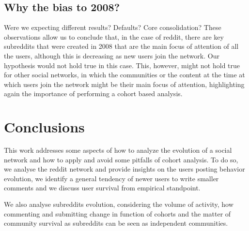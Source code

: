 \subsection{Why the bias to 2008?}

Were we expecting different results? Defaults? Core consolidation? 
These observations allow us to conclude that, in the case of reddit, there are key subreddits that were created in 2008 that are the main focus of attention of all the users, although this is decreasing as new users join the network. Our hypothesis would not hold true in this case. This, however, might not hold true for other social networks, in which the communities or the content at the time at which users join the network might be their main focus of attention, highlighting again the importance of performing a cohort based analysis.

\section{Conclusions}

This work addresses some aspects of how to analyze the evolution of a social network and how to apply and avoid some pitfalls of cohort analysis. To do so, we analyse the reddit network and provide insights on the users posting behavior evolution, we identify a general tendency of newer users to write smaller comments and we discuss user survival from empirical standpoint. 

We also analyse subreddits evolution, considering the volume of activity, how commenting and submitting change in function of cohorts and the matter of community survival as subreddits can be seen as independent communities.
